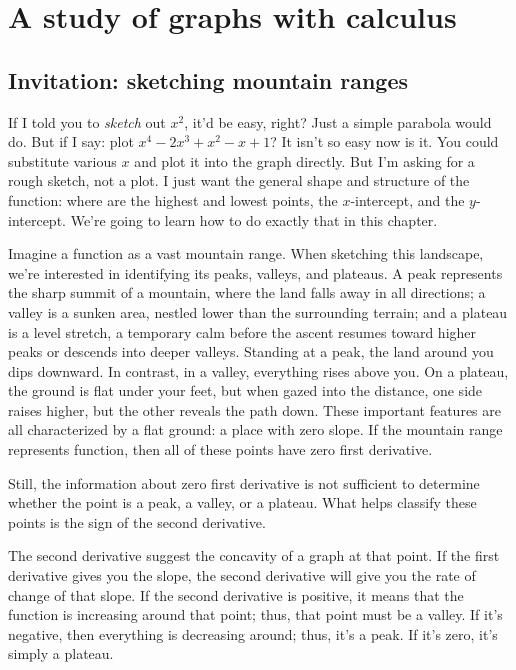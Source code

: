 \chapter{A study of graphs with calculus}
\label{sec:calculus-and-geometry}

\section{Invitation: sketching mountain ranges}

If I told you to \emph{sketch} out $x^2$, it'd be easy, right? Just a simple parabola would do. But if I say: plot $x^4 - 2x^3 + x^2 - x + 1$? It isn't so easy now is it. You could substitute various $x$ and plot it into the graph directly. But I'm asking for a rough sketch, not a plot. I just want the general shape and structure of the function: where are the highest and lowest points, the $x$-intercept, and the $y$-intercept. We're going to learn how to do exactly that in this chapter.

Imagine a function as a vast mountain range. When sketching this landscape, we're interested in identifying its peaks, valleys, and plateaus. A peak represents the sharp summit of a mountain, where the land falls away in all directions; a valley is a sunken area, nestled lower than the surrounding terrain; and a plateau is a level stretch, a temporary calm before the ascent resumes toward higher peaks or descends into deeper valleys. Standing at a peak, the land around you dips downward. In contrast, in a valley, everything rises above you. On a plateau, the ground is flat under your feet, but when gazed into the distance, one side raises higher, but the other reveals the path down. These important features are all characterized by a flat ground: a place with zero slope. If the mountain range represents function, then all of these points have zero first derivative.

Still, the information about zero first derivative is not sufficient to determine whether the point is a peak, a valley, or a plateau. What helps classify these points is the sign of the second derivative.

The second derivative suggest the concavity of a graph at that point. If the first derivative gives you the slope, the second derivative will give you the rate of change of that slope. If the second derivative is positive, it means that the function is increasing around that point; thus, that point must be a valley. If it's negative, then everything is decreasing around; thus, it's a peak. If it's zero, it's simply a plateau.

